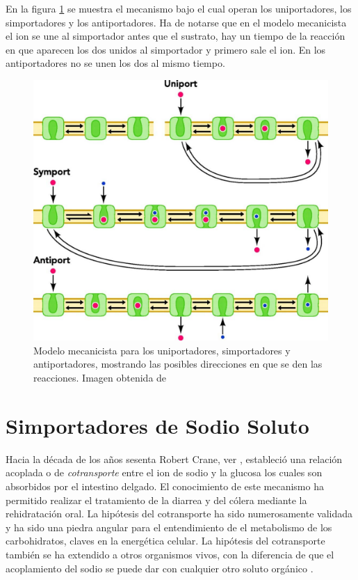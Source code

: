  En la figura \ref{fig:por} se muestra el mecanismo bajo el cual operan los uniportadores, los simportadores y los antiportadores. Ha de notarse que en el modelo mecanicista el ion se une al simportador antes que el sustrato, hay un tiempo de la reacci\'{o}n en que aparecen los dos unidos al simportador y primero sale el ion. En los antiportadores no se unen los dos al mismo tiempo.\\
\begin{figure}[H]
\centering
\includegraphics[scale=0.2]{Kap3/porters.png}
\caption{Modelo mecanicista para los uniportadores, simportadores y antiportadores, mostrando las posibles direcciones en que se den las reacciones. Imagen obtenida de \cite{KelliNicoleKazmier2013}}\label{fig:por}
\end{figure}

\section{Simportadores de Sodio Soluto}
Hacia la d\'{e}cada de los a\~{n}os sesenta Robert Crane, ver \cite{Hamilton2013}, estableci\'{o} una relaci\'{o}n acoplada o de \textit{cotransporte} entre el ion de sodio y la glucosa los cuales son absorbidos por el intestino delgado. El conocimiento de este mecanismo ha permitido realizar el tratamiento de la diarrea y del c\'{o}lera mediante la rehidrataci\'{o}n oral. La hip\'{o}tesis del cotransporte ha sido numerosamente validada y ha sido una piedra angular para el entendimiento de el metabolismo de los carbohidratos, claves en la energ\'{e}tica celular. La hip\'{o}tesis del cotransporte tambi\'{e}n se ha extendido a otros organismos vivos, con la diferencia de que el acoplamiento del sodio se puede dar con cualquier otro soluto org\'{a}nico \cite{Faham2008}.\\

